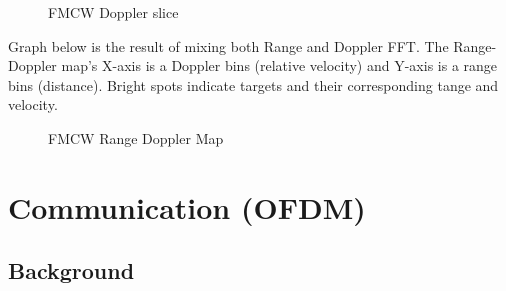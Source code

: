 \documentclass[conference]{IEEEtran}
\begin{document}
	\begin{figure}[H]
	    		\centering
	    		\caption{FMCW Doppler slice}
		\end{figure}
	
Graph below is the result of mixing both Range and Doppler FFT. The Range-Doppler map's X-axis is a Doppler bins (relative velocity) and Y-axis is a range bins (distance). Bright spots indicate targets and their corresponding tange and velocity.
	\begin{figure}[H]
	    		\centering
	    		\caption{FMCW Range Doppler Map}
		\end{figure}
		
		
     \section {Communication (OFDM)}
     
	 \subsection {Background}
 
\end{document}
